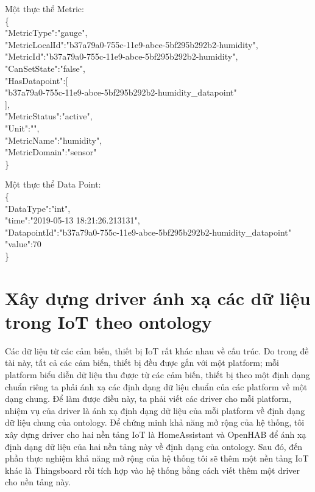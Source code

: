 \hspace{0mm}Một thực thể Metric:\\
\{\\
\blank{1cm}"MetricType":"gauge",\\
\blank{1cm}"MetricLocalId":"b37a79a0-755c-11e9-abce-5bf295b292b2-humidity",\\
\blank{1cm}"MetricId":"b37a79a0-755c-11e9-abce-5bf295b292b2-humidity",\\
\blank{1cm}"CanSetState":"false",\\
\blank{1cm}"HasDatapoint":[\\
\blank{2cm}"b37a79a0-755c-11e9-abce-5bf295b292b2-humidity\_datapoint"\\
\blank{1cm}],\\
\blank{1cm}"MetricStatus":"active",\\
\blank{1cm}"Unit":"",\\
\blank{1cm}"MetricName":"humidity",\\
\blank{1cm}"MetricDomain":"sensor"\\
\}

\hspace{0mm}Một thực thể Data Point:\\
\{\\
\blank{1cm}"DataType":"int",\\
\blank{1cm}"time":"2019-05-13 18:21:26.213131",\\
\blank{1cm}"DatapointId":"b37a79a0-755c-11e9-abce-5bf295b292b2-humidity\_datapoint"\\
\blank{1cm}"value":70\\
\}


\section{Xây dựng driver ánh xạ các dữ liệu trong IoT theo ontology}
Các dữ liệu từ các cảm biến, thiết bị IoT rất khác nhau về cấu trúc. Do trong đề tài này, tất cả các cảm biến, thiết bị đều được gắn với một platform; mỗi platform biểu diễn dữ liệu thu được từ các cảm biến, thiết bị theo một định dạng chuẩn riêng ta phải ánh xạ các định dạng dữ liệu chuẩn của các platform về một dạng chung. Để làm được điều này, ta phải viết các driver cho mỗi platform, nhiệm vụ của driver là ánh xạ định dạng dữ liệu của mỗi platform về định dạng dữ liệu chung của ontology. Để chứng minh khả năng mở rộng của hệ thống, tôi xây dựng driver cho hai nền tảng IoT là HomeAssistant và OpenHAB để ánh xạ định dạng dữ liệu của hai nền tảng này về định dạng của ontology. Sau đó, đến phần thực nghiệm khả năng mở rộng của hệ thống tôi sẽ thêm một nền tảng IoT khác là Thingsboard rồi tích hợp vào hệ thống bằng cách viết thêm một driver cho nền tảng này.\\

